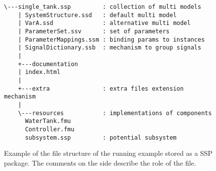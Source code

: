 


\begin{figure}[bt]
\centering

\begin{Verbatim}[tabsize=4,fontsize=\small,samepage=true,frame=single]
\---single_tank.ssp         : collection of multi models
    | SystemStructure.ssd   : default multi model
    | VarA.ssd              : alternative multi model
    | ParameterSet.ssv      : set of parameters
    | ParameterMappings.ssm : binding params to instances
    | SignalDictionary.ssb  : mechanism to group signals
    |
    +---documentation
    | index.html
    |
    +---extra               : extra files extension mechanism
    |
    \---resources           : implementations of components
      WaterTank.fmu
      Controller.fmu	
      subsystem.ssp         : potential subsystem
\end{Verbatim}

\caption{Example of the file structure of the running example stored as a SSP package. 
The comments on the side describe the role of the file. }
\label{fig:ssp_structure}
\end{figure}